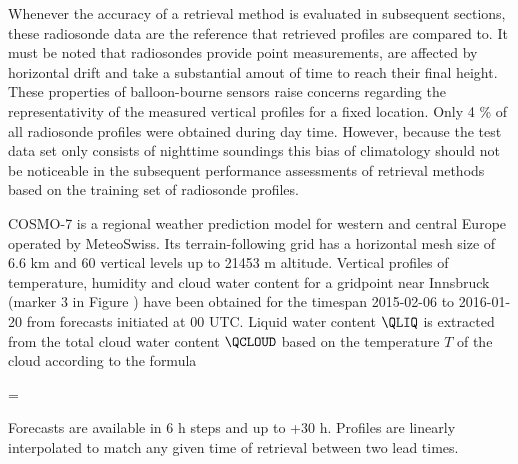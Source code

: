     Whenever the accuracy of a retrieval method is evaluated in subsequent
    sections, these radiosonde data are the reference that retrieved profiles
    are compared to. It must be noted that radiosondes provide point
    measurements, are affected by horizontal drift and take a substantial amout
    of time to reach their final height. These properties of balloon-bourne
    sensors raise concerns regarding the representativity of the measured
    vertical profiles for a fixed location. Only 4 \% of all radiosonde
    profiles were obtained during day time. However, because the test data set
    only consists of nighttime soundings this bias of climatology should not be
    noticeable in the subsequent performance assessments of retrieval methods
    based on the training set of radiosonde profiles.


\stopsection

    {\externalfigure[map][width=\textwidth]}


\startsection[title=COSMO-7 Simulated Soundings]

    COSMO-7 is a regional weather prediction model for western and central
    Europe operated by MeteoSwiss. Its terrain-following grid has a
    horizontal mesh size of 6.6 km and 60 vertical levels up to 21453
    m altitude. Vertical profiles of temperature, humidity and cloud water
    content for a gridpoint near Innsbruck (marker 3 in Figure
    ) have been obtained for the timespan 2015-02-06 to
    2016-01-20 from forecasts initiated at 00 UTC. Liquid water content
    $\QLIQ$ is extracted from the total cloud water content $\QCLOUD$ based on
    the temperature $T$ of the cloud according to the formula

    \startformula
        \QLIQ = \QCLOUD \startcases
              \, \KELVIN \le \TEMP \NR
            \NC {}
                 \, \KELVIN \lt \TEMP {} \, \KELVIN \EQSTOP \NR
              \, \KELVIN \le \TEMP \NR
        \stopcases
    \stopformula

    Forecasts are available in 6 h steps and up to +30 h. Profiles are linearly
    interpolated to match any given time of retrieval between two lead times.

